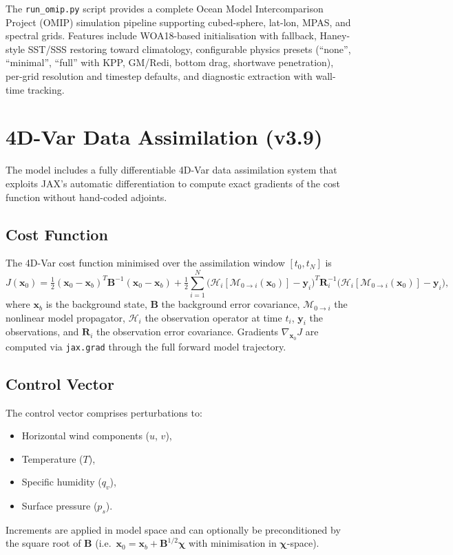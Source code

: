 \documentclass[11pt,a4paper]{article}
\newcommand{\half}{\tfrac{1}{2}}
\begin{document}
The \texttt{run\_omip.py} script provides a complete Ocean Model Intercomparison Project (OMIP) simulation pipeline supporting cubed-sphere, lat-lon, MPAS, and spectral grids.  Features include WOA18-based initialisation with fallback, Haney-style SST/SSS restoring toward climatology, configurable physics presets (``none'', ``minimal'', ``full'' with KPP, GM/Redi, bottom drag, shortwave penetration), per-grid resolution and timestep defaults, and diagnostic extraction with wall-time tracking.

\section{4D-Var Data Assimilation (v3.9)}

The model includes a fully differentiable 4D-Var data assimilation system that exploits JAX's automatic differentiation to compute exact gradients of the cost function without hand-coded adjoints.

\subsection{Cost Function}

The 4D-Var cost function minimised over the assimilation window $[t_0,t_N]$ is
\begin{equation}
  J(\bm x_0) = \half(\bm x_0-\bm x_b)^T \bm B^{-1}(\bm x_0-\bm x_b)
  + \half\sum_{i=1}^{N}\bigl(\mathcal H_i[\mathcal M_{0\to i}(\bm x_0)]-\bm y_i\bigr)^T \bm R_i^{-1}\bigl(\mathcal H_i[\mathcal M_{0\to i}(\bm x_0)]-\bm y_i\bigr),
\end{equation}
where $\bm x_b$ is the background state, $\bm B$ the background error covariance, $\mathcal M_{0\to i}$ the nonlinear model propagator, $\mathcal H_i$ the observation operator at time $t_i$, $\bm y_i$ the observations, and $\bm R_i$ the observation error covariance.  Gradients $\nabla_{\bm x_0}J$ are computed via \texttt{jax.grad} through the full forward model trajectory.

\subsection{Control Vector}

The control vector comprises perturbations to:
\begin{itemize}[nosep]
  \item Horizontal wind components ($u$, $v$),
  \item Temperature ($T$),
  \item Specific humidity ($q_v$),
  \item Surface pressure ($p_s$).
\end{itemize}
Increments are applied in model space and can optionally be preconditioned by the square root of $\bm B$ (i.e.\ $\bm x_0 = \bm x_b + \bm B^{1/2}\bm\chi$ with minimisation in $\bm\chi$-space).
\end{document}
